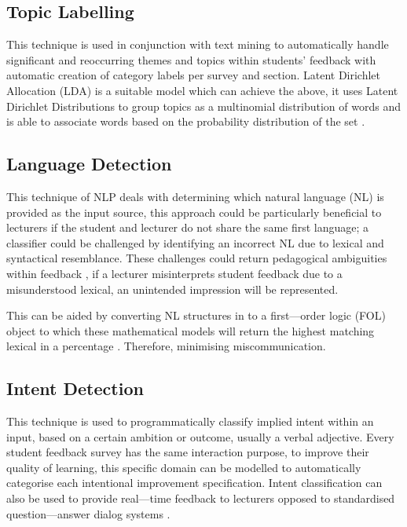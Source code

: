 \subsection{Topic Labelling}

This technique is used in conjunction with text mining to automatically handle significant and reoccurring themes and topics within students’ feedback with automatic creation of category labels per survey and section. Latent Dirichlet Allocation (LDA) is a suitable model which can achieve the above, it uses Latent Dirichlet Distributions to group topics as a multinomial distribution of words and is able to associate words based on the probability distribution of the set \parencite{unankard2019topic}.

\subsection{Language Detection}

This technique of NLP deals with determining which natural language (NL) is provided as the input source, this approach could be particularly beneficial to lecturers if the student and lecturer do not share the same first language; a classifier could be challenged by identifying an incorrect NL due to lexical and syntactical resemblance. These challenges could return pedagogical ambiguities within feedback \parencite{heift2017computer}, if a lecturer misinterprets student feedback due to a misunderstood lexical, an unintended impression will be represented.

This can be aided by converting NL structures in to a first---order logic (FOL) object to which these mathematical models will return the highest matching lexical in a percentage \parencite{perikos2017assistance}. Therefore, minimising miscommunication.

\subsection{Intent Detection}

This technique is used to programmatically classify implied intent within an input, based on a certain ambition or outcome, usually a verbal adjective. Every student feedback survey has the same interaction purpose, to improve their quality of learning, this specific domain can be modelled to automatically categorise each intentional improvement specification. Intent classification can also be used to provide real---time feedback to lecturers opposed to standardised question---answer dialog systems \parencite{jensen2020toward}.

